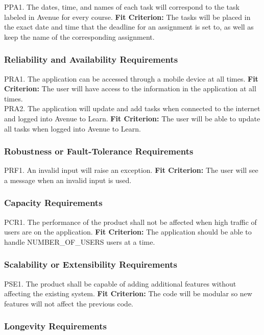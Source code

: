\documentclass[12pt, titlepage]{article}
\begin{document}
PPA1. The dates, time, and names of each task will correspond to the task labeled in Avenue for every course.
	\textbf{Fit Criterion:} The tasks will be placed in the exact date and time that the deadline for an 
assignment is set to, as well as keep the name of the corresponding assignment.

\subsubsection{Reliability and Availability Requirements}

PRA1. The application can be accessed through a mobile device at all times.
	\textbf{Fit Criterion:} The user will have access to the information in the application at all times.\\

\noindent PRA2. The application will update and add tasks when connected to the internet and logged into Avenue to Learn.
	\textbf{Fit Criterion:} The user will be able to update all tasks when logged into Avenue to 
Learn.

\subsubsection{Robustness or Fault-Tolerance Requirements}

PRF1. An invalid input will raise an exception.
	\textbf{Fit Criterion:} The user will see a message when an invalid input is used.

\subsubsection{Capacity Requirements}

PCR1. The performance of the product shall not be affected when high traffic of users are on the application.
	\textbf{Fit Criterion:} The application should be able to handle NUMBER\_OF\_USERS users at 
a time.

\subsubsection{Scalability or Extensibility Requirements}

PSE1. The product shall be capable of adding additional features without affecting the existing system.
	\textbf{Fit Criterion:} The code will be modular so new features will not affect the previous 
code.

\subsubsection{Longevity Requirements}
\end{document}
